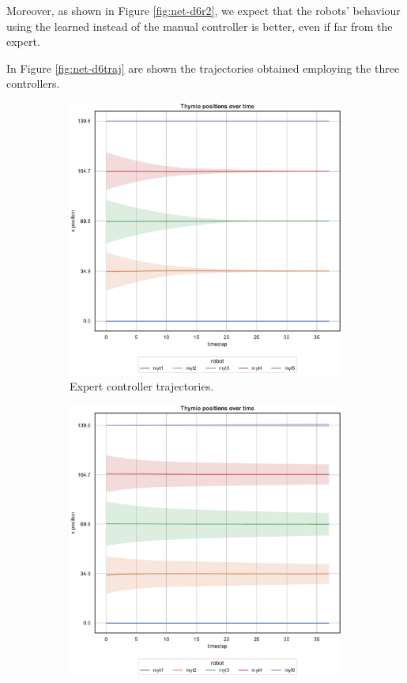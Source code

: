 Moreover, as shown in Figure \ref{fig:net-d6r2}, we expect that the robots’ 
behaviour using the learned instead of the manual controller is better, even if far 
from the expert.

In Figure \ref{fig:net-d6traj} are shown the trajectories obtained employing the 
three controllers. 
\begin{figure}[!htb]
	\begin{center}
		\begin{subfigure}[h]{0.49\textwidth}
			\centering
			\includegraphics[width=.95\textwidth]{contents/images/net-d6/position-overtime-omniscient}%
			\caption{Expert controller trajectories.}
		\end{subfigure}
		\hfill
		\begin{subfigure}[h]{0.49\textwidth}
			\centering
			\includegraphics[width=.95\textwidth]{contents/images/net-d6/position-overtime-learned_distributed}

\end{subfigure}
\end{center}
\end{figure}
